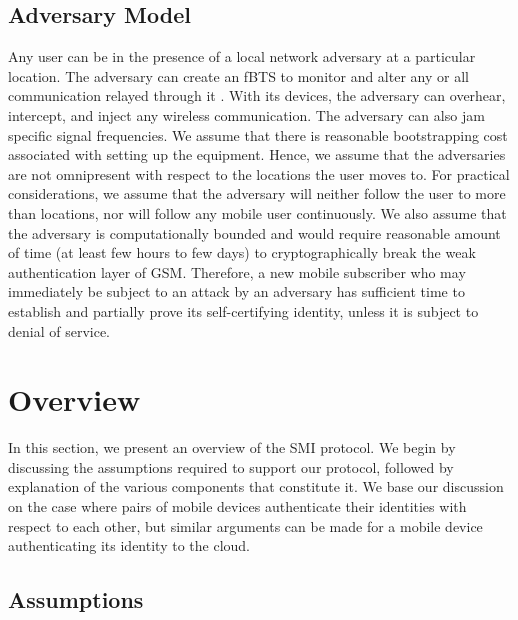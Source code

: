 \documentclass[letterpaper,twocolumn]{sig-alternate}
\begin{document}
\subsection{Adversary Model}
\label{admodel}

Any user can be in the presence of a local network adversary at a particular location. The adversary can create an fBTS to monitor and alter any or all communication relayed through it \cite{stхhlberg2000radio}. With its devices, the adversary can overhear, intercept, and inject any wireless communication. The adversary can also jam specific signal frequencies. We assume that there is reasonable bootstrapping cost associated with setting up the equipment. Hence, we assume that the adversaries are not omnipresent with respect to the locations the user moves to. For practical considerations, we assume that the adversary will neither follow the user to more than  locations, nor will follow any mobile user continuously. We also assume that the adversary is computationally bounded and would require reasonable amount of time (at least few hours \cite{dunkelman2010practical} to few days) to cryptographically break the weak authentication layer of GSM. Therefore, a new mobile subscriber who may immediately be subject to an attack by an adversary has sufficient time to establish and partially prove its self-certifying identity, unless it is subject to denial of service.

 \section{Overview}
\label{smprot}

In this section, we present an overview of the SMI protocol. We begin by discussing the assumptions required to support our protocol, followed by explanation of the various components that constitute it. We base our discussion on the case where pairs of mobile devices authenticate their identities with respect to each other, but similar arguments can be made for a mobile device authenticating its identity to the cloud.
 
\subsection{Assumptions}
\label{powt}
\end{document}
